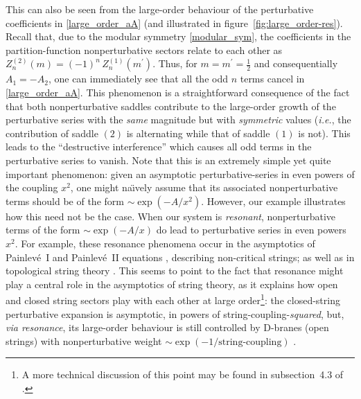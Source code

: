 \documentclass[11pt,a4paper]{article}
\begin{document}
This can also be seen from the large-order behaviour of the perturbative coefficients in \eqref{large_order_aA} (and illustrated in figure~\ref{fig:large_order-res}). Recall that, due to the modular symmetry \eqref{modular_sym}, the coefficients in the partition-function nonperturbative sectors relate to each other as $Z^{(2)}_n (m) = (-1)^n\, Z^{(1)}_n(m^\prime)$. Thus, for $m=m^\prime=\frac{1}{2}$ and consequentially $A_1 = -A_2$, one can immediately see that all the odd $n$ terms cancel in \eqref{large_order_aA}. This phenomenon is a straightforward consequence of the fact that both nonperturbative saddles contribute to the large-order growth of the perturbative series with the \textit{same} magnitude but with \textit{symmetric} values (\textit{i.e.}, the contribution of saddle $(2)$ is alternating while that of saddle $(1)$ is not). This leads to the ``destructive interference'' which causes all odd terms in the perturbative series to vanish. Note that this is an extremely simple yet quite important phenomenon: given an asymptotic perturbative-series in even powers of the coupling $x^2$, one might na\"\i vely assume that its associated nonperturbative terms should be of the form $\sim \exp \left( - A/x^2 \right)$. However, our example illustrates how this need not be the case. When our system is \textit{resonant}, nonperturbative terms of the form $\sim \exp \left( - A/x \right)$ do lead to perturbative series in even powers $x^2$. For example, these resonance phenomena occur in the asymptotics of Painlev\'e~I and Painlev\'e~II equations \cite{gikm10, asv11, sv13}, describing non-critical strings; as well as in topological string theory \cite{ps09, cesv13, cesv14, c15}. This seems to point to the fact that resonance might play a central role in the asymptotics of string theory, as it explains how open and closed string sectors play with each other at large order\footnote{A more technical discussion of this point may be found in subsection~4.3 of \cite{asv11}.}: the closed-string perturbative expansion is asymptotic, in powers of string-coupling-\textit{squared}, but, \textit{via resonance}, its large-order behaviour is still controlled by D-branes (open strings) with nonperturbative weight $\sim \exp \left( - 1/\text{string-coupling} \right)$ \cite{s90, p95}.
\end{document}
